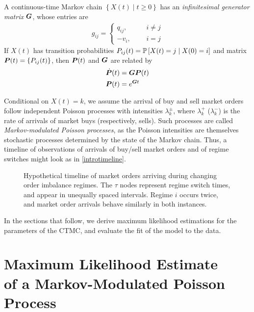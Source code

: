\begin{defn}
A continuous-time Markov chain $\left\lbrace X(t) \; | \; t \geq 0 \right\rbrace$  has an \emph{infinitesimal generator matrix} $\mat{G}$, whose entries are
\begin{align}
g_{ij} = \begin{cases} q_{ij}, \qquad & i \neq j \\
						-v_i, & i = j \end{cases}
\end{align}
If $X(t)$ has transition probabilities $P_{ij}(t) = \P \left[ X(t) = j \; | \; X(0) = i \right]$ and matrix $\mat{P}(t) = \lbrace P_{ij}(t) \rbrace$, then $\mat{P}(t)$ and $\mat{G}$ are related by
\begin{align}
\dot{\mat{P}}(t) & = \mat{G} \mat{P}(t) \\
\mat{P}(t)  &= e^{\mat{G}t} \label{eq:CTMCPG}
\end{align}
\end{defn}

Conditional on $X(t) = k$, we assume the arrival of buy and sell market orders follow independent Poisson processes with intensities $\lambda_k^\pm$, where $\lambda_k^+$ ($\lambda_k^-$) is the rate of arrivals of market buys (respectively, sells). Such processes are called \textit{Markov-modulated Poisson processes}, as the Poisson intensities are themselves stochastic processes determined by the state of the Markov chain. Thus, a timeline of observations of arrivals of buy/sell market orders and of regime switches might look as in \autoref{introtimeline}.

\begin{figure}
  \resizebox{\linewidth}{!}{}
\caption[Hypothetical timeline of market orders and imbalance regime switches]{Hypothetical timeline of market orders arriving during changing order imbalance regimes. The $\tau$ nodes represent regime switch times, and appear in unequally spaced intervals. Regime $i$ occurs twice, and market order arrivals behave similarly in both instances.}
\label{introtimeline}
\end{figure}

In the sections that follow, we derive maximum likelihood estimations for the parameters of the CTMC, and evaluate the fit of the model to the data.

\section[Maximum Likelihood Estimate of a Markov-Modulated Poisson Process]{Maximum Likelihood Estimate \texorpdfstring{\\}{} of a Markov-Modulated Poisson Process}

